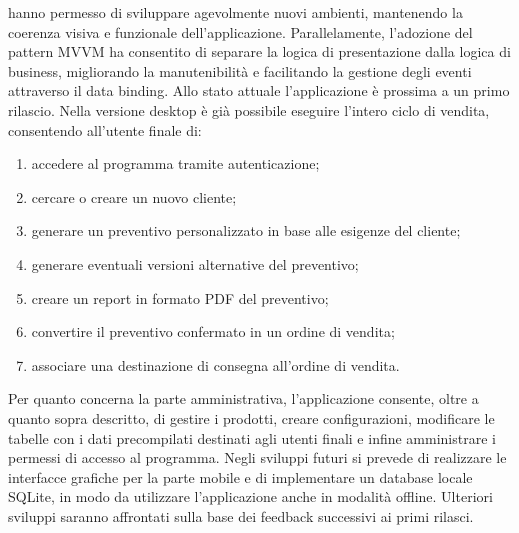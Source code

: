 hanno permesso di sviluppare agevolmente nuovi ambienti,
mantenendo la coerenza visiva e funzionale dell'applicazione.
Parallelamente, l'adozione del pattern \ac{MVVM} ha consentito di separare
la logica di presentazione dalla logica di business, migliorando la manutenibilità
e facilitando la gestione degli eventi attraverso il data binding.
Allo stato attuale l'applicazione è prossima a un primo rilascio.
Nella versione desktop è già possibile eseguire l'intero ciclo di vendita,
consentendo all'utente finale di:
\begin{enumerate}
    \item accedere al programma tramite autenticazione;
    \item cercare o creare un nuovo cliente;
    \item generare un preventivo personalizzato in base alle esigenze del cliente;
    \item generare eventuali versioni alternative del preventivo;
    \item creare un report in formato PDF del preventivo;
    \item convertire il preventivo confermato in un ordine di vendita;
    \item associare una destinazione di consegna all'ordine di vendita.
\end{enumerate}
Per quanto concerna la parte amministrativa,
l'applicazione consente, oltre a quanto sopra descritto,
di gestire i prodotti, creare configurazioni, modificare le tabelle con i
dati precompilati destinati agli utenti finali e infine amministrare i permessi
di accesso al programma. Negli sviluppi futuri si prevede di realizzare le interfacce grafiche per
la parte mobile e di implementare un database locale SQLite,
in modo da utilizzare l'applicazione anche in modalità offline.
Ulteriori sviluppi saranno affrontati sulla base dei feedback successivi
ai primi rilasci.